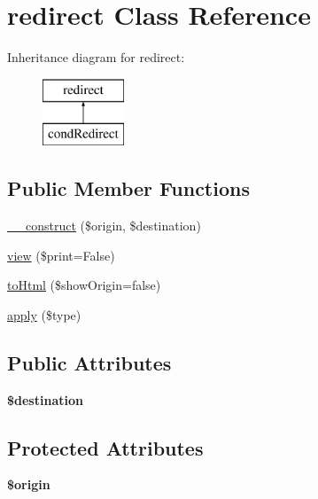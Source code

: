 \hypertarget{classredirect}{\section{redirect Class Reference}
\label{classredirect}
}
Inheritance diagram for redirect\-:\begin{figure}[H]
\begin{center}
\leavevmode
\includegraphics[height=2.000000cm]{classredirect}
\end{center}
\end{figure}
\subsection*{Public Member Functions}
\begin{DoxyCompactItemize}
\item 
\hyperlink{classredirect_aeb75fcecd20f097028211f5a56d929e7}{\-\_\-\-\_\-construct} (\$origin, \$destination)
\item 
\hyperlink{classredirect_a87c9d9aae382680b6e178229aaf56ce7}{view} (\$print=False)
\item 
\hyperlink{classredirect_a17326a08f9ee54def5ba1009a921b497}{to\-Html} (\$show\-Origin=false)
\item 
\hyperlink{classredirect_a7ebcebe7835af89c6b1a1f923a0721d9}{apply} (\$type)
\end{DoxyCompactItemize}
\subsection*{Public Attributes}
\begin{DoxyCompactItemize}
\item 
\hypertarget{classredirect_a30f64965b315e2710cd0376b5a57d214}{{\bfseries \$destination}}\label{classredirect_a30f64965b315e2710cd0376b5a57d214}

\end{DoxyCompactItemize}
\subsection*{Protected Attributes}
\begin{DoxyCompactItemize}
\item 
\hypertarget{classredirect_ad2813e1fba10299accc9939399a5e3ee}{{\bfseries \$origin}}\label{classredirect_ad2813e1fba10299accc9939399a5e3ee}

\end{DoxyCompactItemize}


